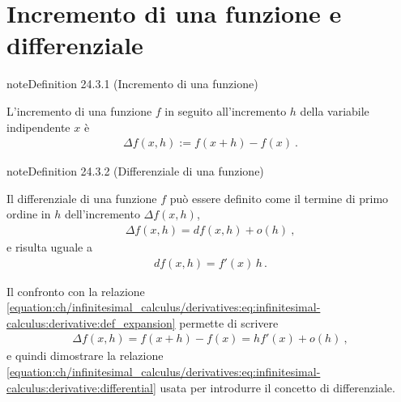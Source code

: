 \documentclass[letterpaper,10pt,italian]{jupyterBook}
\begin{document}
\section{Incremento di una funzione e differenziale}
\label{\detokenize{ch/infinitesimal_calculus/derivatives:incremento-di-una-funzione-e-differenziale}}\label{\detokenize{ch/infinitesimal_calculus/derivatives:infinitesimal-calculus-derivatives-differential}}\label{ch/infinitesimal_calculus/derivatives:definition-2}
\begin{sphinxadmonition}{note}{Definition 24.3.1 (Incremento di una funzione)}



\sphinxAtStartPar
L’incremento di una funzione \(f\) in seguito all’incremento \(h\) della variabile indipendente \(x\) è
\begin{equation*}
\begin{split}\Delta f (x, h) := f(x+h) - f(x) \ .\end{split}
\end{equation*}\end{sphinxadmonition}
\label{ch/infinitesimal_calculus/derivatives:definition-3}
\begin{sphinxadmonition}{note}{Definition 24.3.2 (Differenziale di una funzione)}



\sphinxAtStartPar
Il differenziale di una funzione \(f\) può essere definito come il termine di primo ordine in \(h\) dell’incremento \(\Delta f(x,h)\),
\begin{equation*}
\begin{split}\Delta f(x,h) = d f(x,h) + o(h) \ ,\end{split}
\end{equation*}
\sphinxAtStartPar
e risulta uguale a
\begin{equation}\label{equation:ch/infinitesimal_calculus/derivatives:eq:infinitesimal-calculus:derivative:differential}
\begin{split}d f(x, h) = f'(x) \, h \, .\end{split}
\end{equation}\end{sphinxadmonition}

\sphinxAtStartPar
Il confronto con la relazione \eqref{equation:ch/infinitesimal_calculus/derivatives:eq:infinitesimal-calculus:derivative:def_expansion} permette di scrivere
\begin{equation*}
\begin{split}\Delta f(x,h) = f(x+h) - f(x) = h f'(x) + o(h) \ ,\end{split}
\end{equation*}
\sphinxAtStartPar
e quindi dimostrare la relazione \eqref{equation:ch/infinitesimal_calculus/derivatives:eq:infinitesimal-calculus:derivative:differential} usata per introdurre il concetto di differenziale.
\end{document}
